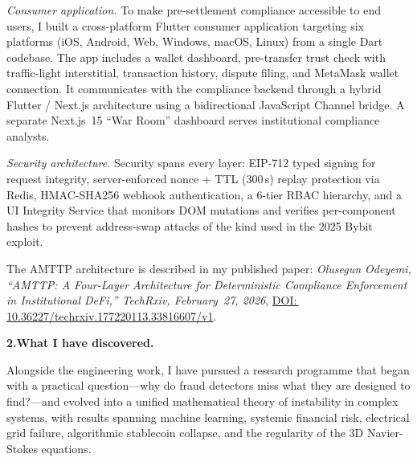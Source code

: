 \documentclass[12pt,a4paper]{article}
\begin{document}
\textit{Consumer application.}\;
To make pre-settlement compliance accessible to end users, I built a
cross-platform Flutter consumer application targeting six platforms
(iOS, Android, Web, Windows, macOS, Linux) from a single Dart codebase.
The app includes a wallet dashboard, pre-transfer trust check with
traffic-light interstitial, transaction history, dispute filing, and
MetaMask wallet connection.  It communicates with the compliance backend
through a hybrid Flutter / Next.js architecture using a bidirectional
JavaScript Channel bridge.  A separate Next.js~15 ``War Room'' dashboard
serves institutional compliance analysts.

\textit{Security architecture.}\;
Security spans every layer: EIP-712 typed signing for request integrity,
server-enforced nonce + TTL (300\,s) replay protection via Redis,
HMAC-SHA256 webhook authentication, a 6-tier RBAC hierarchy, and a
UI Integrity Service that monitors DOM mutations and verifies per-component
hashes to prevent address-swap attacks of the kind used in the 2025
Bybit exploit.

The AMTTP architecture is described in my published paper:
\textit{Olusegun Odeyemi, ``AMTTP: A Four-Layer Architecture for
Deterministic Compliance Enforcement in Institutional DeFi,''
TechRxiv, February~27, 2026},
\href{https://doi.org/10.36227/techrxiv.177220113.33816607/v1}{DOI:\,10.36227/techrxiv.177220113.33816607/v1}.


\textbf{2.\enspace What I have discovered.}

Alongside the engineering work, I have pursued a research programme that
began with a practical question---why do fraud detectors miss what they
are designed to find?---and evolved into a unified mathematical theory of
instability in complex systems, with results spanning machine learning,
systemic financial risk, electrical grid failure, algorithmic stablecoin
collapse, and the regularity of the 3D Navier-Stokes equations.
\end{document}
